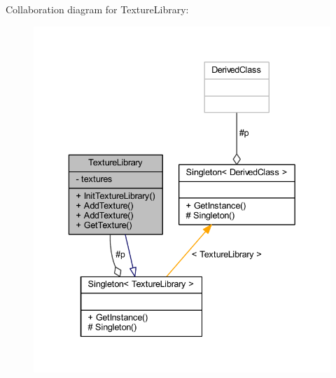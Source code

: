 Collaboration diagram for Texture\+Library\+:\nopagebreak
\begin{figure}[H]
\begin{center}
\leavevmode
\includegraphics[width=336pt]{class_texture_library__coll__graph}
\end{center}
\end{figure}
